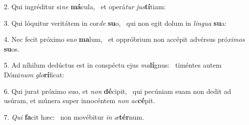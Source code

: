 2. Qui ingréditur si\textit{ne} \textbf{má}cula, \ast\  et operá\textit{tur} \textit{jus}\textbf{tí}tiam:\

3. Qui lóquitur veritátem in cor\textit{de} \textbf{su}o, \ast\  qui non egit dolum in \textit{lin}\textit{gua} \textbf{su}a:\

4. Nec fecit próximo su\textit{o} \textbf{ma}lum, \ast\  et oppróbrium non accépit advérsus pró\textit{xi}\textit{mos} \textbf{su}os.\

5. Ad níhilum dedúctus est in conspéctu ejus \textit{ma}\textbf{lí}gnus: \ast\  timéntes autem Dómi\textit{num} \textit{glo}\textbf{rí}ficat:\

6. Qui jurat próximo suo, et \textit{non} \textbf{dé}cipit, \ast\  qui pecúniam suam non dedit ad usúram, et múnera super innocéntem \textit{non} \textit{ac}\textbf{cé}pit.\

7. \textit{Qui} \textbf{fa}cit hæc: \ast\  non movébitur \textit{in} \textit{æ}\textbf{tér}num.\

